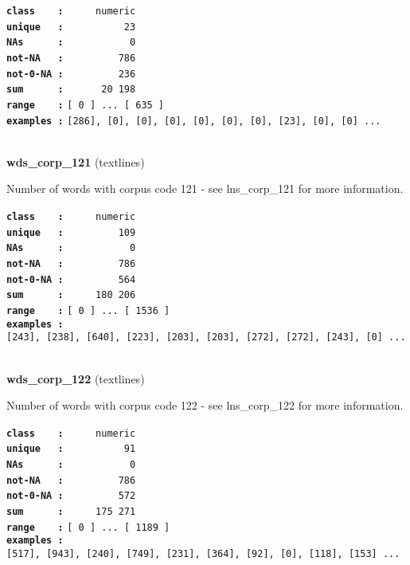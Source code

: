 \documentclass[]{article}
\begin{document}
\textbf{\texttt{class\ \ \ \ :}} \texttt{~~~~~numeric}\\
\textbf{\texttt{unique\ \ \ :}} \texttt{~~~~~~~~~~23}\\
\textbf{\texttt{NAs\ \ \ \ \ \ :}} \texttt{~~~~~~~~~~~0}\\
\textbf{\texttt{not-NA\ \ \ :}} \texttt{~~~~~~~~~786}\\
\textbf{\texttt{not-0-NA\ :}} \texttt{~~~~~~~~~236}\\
\textbf{\texttt{sum\ \ \ \ \ \ :}} \texttt{~~~~~~20~198}\\
\textbf{\texttt{range\ \ \ \ :}}
\texttt{{[}\ 0\ {]}\ ...\ {[}\ 635\ {]}}\\
\textbf{\texttt{examples\ :}}
\texttt{{[}286{]},\ {[}0{]},\ {[}0{]},\ {[}0{]},\ {[}0{]},\ {[}0{]},\ {[}0{]},\ {[}23{]},\ {[}0{]},\ {[}0{]}\ ...}\\

~

\textbf{wds\_corp\_121} (textlines)

Number of words with corpus code 121 - see lns\_corp\_121 for more
information.

\textbf{\texttt{class\ \ \ \ :}} \texttt{~~~~~numeric}\\
\textbf{\texttt{unique\ \ \ :}} \texttt{~~~~~~~~~109}\\
\textbf{\texttt{NAs\ \ \ \ \ \ :}} \texttt{~~~~~~~~~~~0}\\
\textbf{\texttt{not-NA\ \ \ :}} \texttt{~~~~~~~~~786}\\
\textbf{\texttt{not-0-NA\ :}} \texttt{~~~~~~~~~564}\\
\textbf{\texttt{sum\ \ \ \ \ \ :}} \texttt{~~~~~180~206}\\
\textbf{\texttt{range\ \ \ \ :}}
\texttt{{[}\ 0\ {]}\ ...\ {[}\ 1536\ {]}}\\
\textbf{\texttt{examples\ :}}
\texttt{{[}243{]},\ {[}238{]},\ {[}640{]},\ {[}223{]},\ {[}203{]},\ {[}203{]},\ {[}272{]},\ {[}272{]},\ {[}243{]},\ {[}0{]}\ ...}\\

~

\textbf{wds\_corp\_122} (textlines)

Number of words with corpus code 122 - see lns\_corp\_122 for more
information.

\textbf{\texttt{class\ \ \ \ :}} \texttt{~~~~~numeric}\\
\textbf{\texttt{unique\ \ \ :}} \texttt{~~~~~~~~~~91}\\
\textbf{\texttt{NAs\ \ \ \ \ \ :}} \texttt{~~~~~~~~~~~0}\\
\textbf{\texttt{not-NA\ \ \ :}} \texttt{~~~~~~~~~786}\\
\textbf{\texttt{not-0-NA\ :}} \texttt{~~~~~~~~~572}\\
\textbf{\texttt{sum\ \ \ \ \ \ :}} \texttt{~~~~~175~271}\\
\textbf{\texttt{range\ \ \ \ :}}
\texttt{{[}\ 0\ {]}\ ...\ {[}\ 1189\ {]}}\\
\textbf{\texttt{examples\ :}}
\texttt{{[}517{]},\ {[}943{]},\ {[}240{]},\ {[}749{]},\ {[}231{]},\ {[}364{]},\ {[}92{]},\ {[}0{]},\ {[}118{]},\ {[}153{]}\ ...}\\
\end{document}
